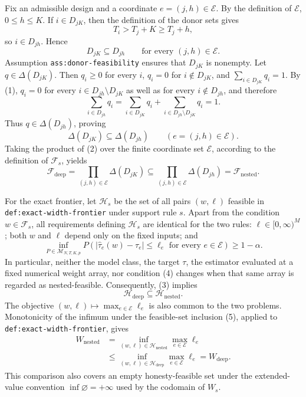 Fix an admissible design and a coordinate \(e=(j,h)\in\mathcal E\).  By the definition of \(\mathcal E\), \(0\leq h\leq K\).  If \(i\in D_{jK}\), then the definition of the donor sets gives
\[
 T_i>T_j+K\geq T_j+h,
\]
so \(i\in D_{jh}\).  Hence
\[
 D_{jK}\subseteq D_{jh}
 \qquad\text{for every }(j,h)\in\mathcal E. \tag{1}
\]
Assumption \texttt{ass:donor-feasibility} ensures that \(D_{jK}\) is nonempty.  Let \(q\in\Delta(D_{jK})\).  Then \(q_i\geq0\) for every \(i\), \(q_i=0\) for \(i\notin D_{jK}\), and \(\sum_{i\in D_{jK}}q_i=1\).  By (1), \(q_i=0\) for every \(i\in D_{jh}\setminus D_{jK}\) as well as for every \(i\notin D_{jh}\), and therefore
\[
 \sum_{i\in D_{jh}}q_i
 =\sum_{i\in D_{jK}}q_i
  +\sum_{i\in D_{jh}\setminus D_{jK}}q_i
 =1.
\]
Thus \(q\in\Delta(D_{jh})\), proving
\[
 \Delta(D_{jK})\subseteq\Delta(D_{jh})
 \qquad(e=(j,h)\in\mathcal E). \tag{2}
\]
Taking the product of (2) over the finite coordinate set \(\mathcal E\), according to the definition of \(\mathcal F_s\), yields
\[
 \mathcal F_{\mathrm{deep}}
 =\prod_{(j,h)\in\mathcal E}\Delta(D_{jK})
 \subseteq
 \prod_{(j,h)\in\mathcal E}\Delta(D_{jh})
 =\mathcal F_{\mathrm{nested}}. \tag{3}
\]

For the exact frontier, let \(\mathcal H_s\) be the set of all pairs \((w,\ell)\) feasible in \texttt{def:exact-width-frontier} under support rule \(s\).  Apart from the condition \(w\in\mathcal F_s\), all requirements defining \(\mathcal H_s\) are identical for the two rules: \(\ell\in[0,\infty)^M\); both \(w\) and \(\ell\) depend only on the fixed inputs; and
\[
 \inf_{P\in\mathcal M_{N,T,K,p}}
 P\!\left(
   \left|\widehat\tau_e(w)-\tau_e\right|\leq\ell_e
   \text{ for every }e\in\mathcal E
 \right)\geq1-\alpha. \tag{4}
\]
In particular, neither the model class, the target \(\tau\), the estimator evaluated at a fixed numerical weight array, nor condition (4) changes when that same array is regarded as nested-feasible.  Consequently, (3) implies
\[
 \mathcal H_{\mathrm{deep}}\subseteq\mathcal H_{\mathrm{nested}}. \tag{5}
\]
The objective \((w,\ell)\mapsto\max_{e\in\mathcal E}\ell_e\) is also common to the two problems.  Monotonicity of the infimum under the feasible-set inclusion (5), applied to \texttt{def:exact-width-frontier}, gives
\[
 \begin{aligned}
 W_{\mathrm{nested}}
 &=\inf_{(w,\ell)\in\mathcal H_{\mathrm{nested}}}
       \max_{e\in\mathcal E}\ell_e \\
 &\leq\inf_{(w,\ell)\in\mathcal H_{\mathrm{deep}}}
       \max_{e\in\mathcal E}\ell_e
 =W_{\mathrm{deep}}. \tag{6}
 \end{aligned}
\]
This comparison also covers an empty honesty-feasible set under the extended-value convention \(\inf\varnothing=+\infty\) used by the codomain of \(W_s\).

